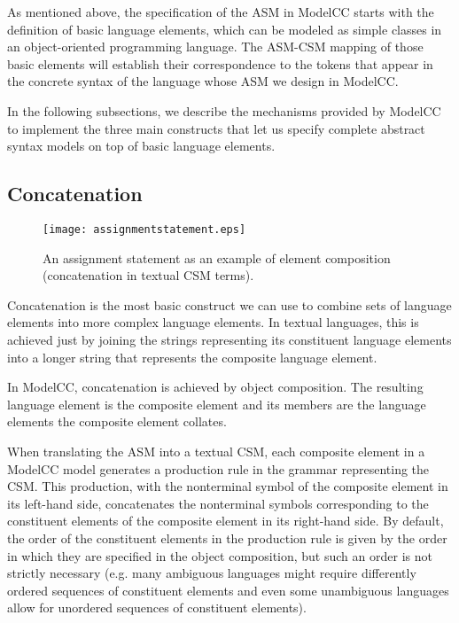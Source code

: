 \documentclass[preprint]{elsarticle}
\begin{document}
As mentioned above, the specification of the ASM in ModelCC starts with the definition of basic language elements, which can be modeled as simple classes in an object-oriented programming language.
The ASM-CSM mapping of those basic elements will establish their correspondence to the tokens that appear in the concrete syntax of the language whose ASM we design in ModelCC.

In the following subsections, we describe the mechanisms provided by ModelCC to implement the three main constructs that let us specify complete abstract syntax models on top of basic
language elements.

\subsection{Concatenation}

\begin{figure}[tb!]
\centering
\texttt{[image: assignmentstatement.eps]}
\caption{An assignment statement as an example of element composition (concatenation in textual CSM terms).} \label{fig:assignmentstatement}
\end{figure}

Concatenation is the most basic construct we can use to combine sets of language elements into more complex language elements.
In textual languages, this is achieved just by joining the strings representing its constituent language elements into a longer string that represents the composite language element.

In ModelCC, concatenation is achieved by object composition.
The resulting language element is the composite element and its members are the language elements the composite element collates.

When translating the ASM into a textual CSM, each composite element in a ModelCC model generates a production rule in the grammar representing the CSM.
This production, with the nonterminal symbol of the composite element in its left-hand side, concatenates the nonterminal symbols corresponding to the constituent elements of the composite element in its right-hand side.
By default, the order of the constituent elements in the production rule is given by the order in which they are specified in the object composition, but such an order is not strictly necessary (e.g. many ambiguous languages might require differently ordered sequences of constituent elements and even some unambiguous languages allow for unordered sequences of constituent elements).
\end{document}
